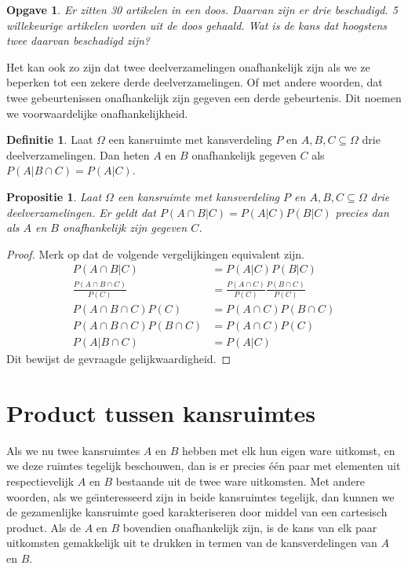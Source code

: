 \documentclass[a4paper]{book}
\newtheorem{proposition}[theorem]{Propositie}
\newtheorem{exercise}[theorem]{Opgave}
\theoremstyle{definition}
\newtheorem{definition}[theorem]{Definitie}
\begin{document}
\begin{exercise}
Er zitten 30 artikelen in een doos. Daarvan zijn er drie beschadigd.
5 willekeurige artikelen worden uit de doos gehaald. Wat is de kans dat hoogstens twee daarvan beschadigd zijn?
\end{exercise}


Het kan ook zo zijn dat twee deelverzamelingen onafhankelijk zijn als we ze beperken tot een zekere derde deelverzamelingen.
Of met andere woorden, dat twee gebeurtenissen onafhankelijk zijn gegeven een derde gebeurtenis.
Dit noemen we voorwaardelijke onafhankelijkheid.
\begin{definition}
    Laat $\Omega$ een kansruimte met kansverdeling $P$ en $A,B,C \subseteq \Omega$ drie deelverzamelingen.
    Dan heten $A$ en $B$ onafhankelijk gegeven $C$ als $P(A|B \cap C) = P(A|C)$.
\end{definition}

\begin{proposition}
    Laat $\Omega$ een kansruimte met kansverdeling $P$ en $A,B,C \subseteq \Omega$ drie deelverzamelingen.
    Er geldt dat $P(A \cap B|C) = P(A|C)P(B|C)$ precies dan als $A$ en $B$ onafhankelijk zijn gegeven $C$.
\end{proposition}
\begin{proof}
    Merk op dat de volgende vergelijkingen equivalent zijn.
    \begin{align*}
        P(A \cap B|C)                       &= P(A|C)P(B|C) \\
        \frac{P(A \cap B \cap C)}{P(C)}     &= \frac{P(A \cap C)}{P(C)} \frac{P(B \cap C)}{P(C)} \\
        P(A \cap B \cap C)P(C)              &= P(A \cap C)P(B \cap C) \\
        P(A \cap B \cap C)P(B \cap C)       &= P(A \cap C)P(C) \\
        P(A | B \cap C)                     &= P(A | C)
    \end{align*}
    Dit bewijst de gevraagde gelijkwaardigheid.
\end{proof}


\section{Product tussen kansruimtes}
Als we nu twee kansruimtes $A$ en $B$ hebben met elk hun eigen ware uitkomst, en we deze ruimtes tegelijk beschouwen, dan is er precies \'e\'en
paar met elementen uit respectievelijk $A$ en $B$ bestaande uit de twee ware uitkomsten.
Met andere woorden, als we ge\"{\i}nteresseerd zijn in beide kansruimtes tegelijk, dan kunnen we de gezamenlijke kansruimte goed karakteriseren
door middel van een cartesisch product.
Als de $A$ en $B$ bovendien onafhankelijk zijn, is de kans van elk paar uitkomsten gemakkelijk uit te drukken in termen van de kansverdelingen van $A$
en $B$.
\end{document}
